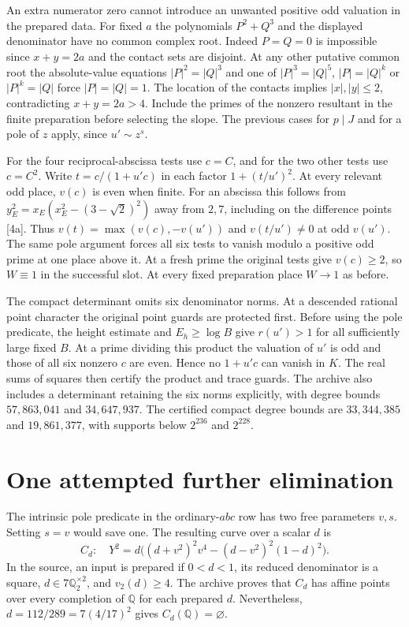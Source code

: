 \documentclass[11pt]{article}
\newcommand{\Q}{\mathbb Q}\newcommand{\Z}{\mathbb Z}
\begin{document}
An extra numerator zero cannot introduce an unwanted positive odd valuation in the prepared data. For fixed $a$ the polynomials $P^2+Q^3$ and the displayed denominator have no common complex root. Indeed $P=Q=0$ is impossible since $x+y=2a$ and the contact sets are disjoint. At any other putative common root the absolute-value equations $|P|^2=|Q|^3$ and one of $|P|^3=|Q|^5$, $|P|=|Q|^k$ or $|P|^k=|Q|$ force $|P|=|Q|=1$. The location of the contacts implies $|x|,|y|\le 2$, contradicting $x+y=2a>4$. Include the primes of the nonzero resultant in the finite preparation before selecting the slope. The previous cases for $p\mid J$ and for a pole of $z$ apply, since $u'\sim z^s$.

For the four reciprocal-abscissa tests use $c=C$, and for the two other tests use $c=C^2$. Write $t=c/(1+u'c)$ in each factor $1+(t/u')^2$. At every relevant odd place, $v(c)$ is even when finite. For an abscissa this follows from $y_E^2=x_E(x_E^2-(3-\sqrt2)^2)$ away from $2,7$, including on the difference points [4a]. Thus $v(t)=\max(v(c),-v(u'))$ and $v(t/u')\ne0$ at odd $v(u')$. The same pole argument forces all six tests to vanish modulo a positive odd prime at one place above it. At a fresh prime the original tests give $v(c)\ge2$, so $W\equiv1$ in the successful slot. At every fixed preparation place $W\to1$ as before.

The compact determinant omits six denominator norms. At a descended rational point character the original point guards are protected first. Before using the pole predicate, the height estimate and $E_h\ge\log B$ give $r(u')>1$ for all sufficiently large fixed $B$. At a prime dividing this product the valuation of $u'$ is odd and those of all six nonzero $c$ are even. Hence no $1+u'c$ can vanish in $K$. The real sums of squares then certify the product and trace guards. The archive also includes a determinant retaining the six norms explicitly, with degree bounds $57{,}863{,}041$ and $34{,}647{,}937$. The certified compact degree bounds are $33{,}344{,}385$ and $19{,}861{,}377$, with supports below $2^{236}$ and $2^{228}$.

\section{One attempted further elimination}
The intrinsic pole predicate in the ordinary-$abc$ row has two free parameters $v,s$. Setting $s=v$ would save one. The resulting curve over a scalar $d$ is
\[
 C_d:\quad Y^2=d\big((d+v^2)^2v^4-(d-v^2)^2(1-d)^2\big).
\]
In the source, an input is prepared if $0<d<1$, its reduced denominator is a square, $d\in7\Q_2^{\times2}$, and $v_2(d)\ge4$. The archive proves that $C_d$ has affine points over every completion of $\Q$ for each prepared $d$. Nevertheless, $d=112/289=7(4/17)^2$ gives $C_d(\Q)=\varnothing$.
\end{document}
